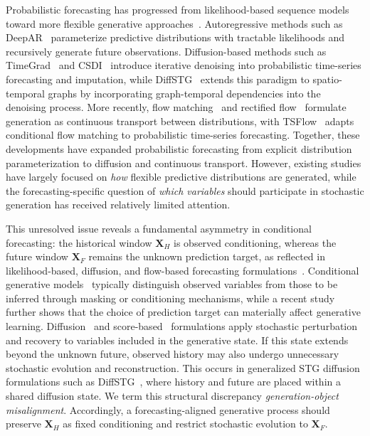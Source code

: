 \documentclass[sigconf, anonymous, review]{acmart}
\begin{document}
Probabilistic forecasting has progressed from likelihood-based sequence
models~\cite{salinas2020deepar} toward more flexible generative
approaches~\cite{rasul2021timegrad,tashiro2021csdi,kollovieh2025tsflow}. Autoregressive
methods such as DeepAR~\cite{salinas2020deepar} parameterize predictive
distributions with tractable likelihoods and recursively generate future
observations. Diffusion-based methods such as
TimeGrad~\cite{rasul2021timegrad} and
CSDI~\cite{tashiro2021csdi} introduce iterative denoising into
probabilistic time-series forecasting and imputation, while
DiffSTG~\cite{wen2023diffstg} extends this paradigm to spatio-temporal
graphs by incorporating graph-temporal dependencies into the denoising
process. More recently, flow matching~\cite{lipman2023flow} and
rectified flow~\cite{liu2023rectified} formulate generation as
continuous transport between distributions, with
TSFlow~\cite{kollovieh2025tsflow} adapts conditional flow matching to
probabilistic time-series forecasting. Together, these developments
have expanded probabilistic forecasting from explicit distribution
parameterization to diffusion and continuous transport. However,
existing studies have largely focused on \emph{how} flexible predictive
distributions are generated, while the forecasting-specific question
of \emph{which variables} should participate in stochastic generation
has received relatively limited attention.

This unresolved issue reveals a fundamental asymmetry in conditional
forecasting: the historical window $\mathbf{X}_H$ is observed
conditioning, whereas the future window $\mathbf{X}_F$ remains the
unknown prediction target, as reflected in likelihood-based, diffusion,
and flow-based forecasting formulations~\cite{salinas2020deepar,
rasul2021timegrad,kollovieh2025tsflow}. Conditional generative models~\cite{tashiro2021csdi,liu2023pristi}
typically distinguish observed variables from those to be inferred
through masking or conditioning mechanisms, while a recent study~\cite{li2026backtobasics} further shows that the choice of prediction target can materially affect generative
learning. Diffusion~\cite{ho2020ddpm} and
score-based~\cite{song2021score} formulations apply stochastic
perturbation and recovery to variables included in the generative state.
If this state extends beyond the unknown future, observed history may
also undergo unnecessary stochastic evolution and reconstruction.
This occurs in generalized STG diffusion formulations such as
DiffSTG~\cite{wen2023diffstg}, where history and future are placed
within a shared diffusion state. We term this structural discrepancy
\emph{generation-object misalignment}. Accordingly, a
forecasting-aligned generative process should preserve
$\mathbf{X}_H$ as fixed conditioning and restrict stochastic evolution
to $\mathbf{X}_F$.
\end{document}

